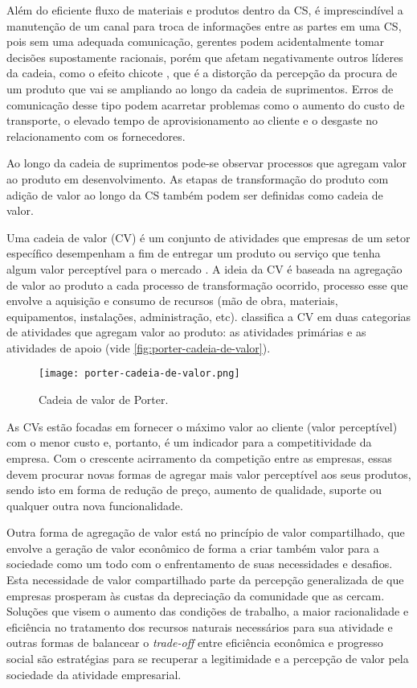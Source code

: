 	Além do eficiente fluxo de materiais e produtos dentro da CS, é imprescindível a manutenção de um canal para troca de informações entre as partes em uma CS, pois sem uma adequada comunicação, gerentes podem acidentalmente tomar decisões supostamente racionais, porém que afetam negativamente outros líderes da cadeia, como o efeito chicote \cite{lee1997bullwhip}, que é a distorção da percepção da procura de um produto que vai se ampliando ao longo da cadeia de suprimentos. Erros de comunicação desse tipo podem acarretar problemas como o aumento do custo de transporte, o elevado tempo de aprovisionamento ao cliente e o desgaste no relacionamento com os fornecedores.
	
	Ao longo da cadeia de suprimentos pode-se observar processos que agregam valor ao produto em desenvolvimento. As etapas de transformação do produto com adição de valor ao longo da CS também podem ser definidas como cadeia de valor.
	
	Uma cadeia de valor (CV) é um conjunto de atividades que empresas de um setor específico desempenham a fim de entregar um produto ou serviço que tenha algum valor perceptível para o mercado \cite{porter1985competitiveadvantage}. A ideia da CV é baseada na agregação de valor ao produto a cada processo de transformação ocorrido, processo esse que envolve a aquisição e consumo de recursos (mão de obra, materiais, equipamentos, instalações, administração, etc).  classifica a CV em duas categorias de atividades que agregam valor ao produto: as atividades primárias e as atividades de apoio (vide \autoref{fig:porter-cadeia-de-valor}).
		
	\begin{figure}[htb]
		\centering
		\caption{Cadeia de valor de Porter.}
		\label{fig:porter-cadeia-de-valor}
		\texttt{[image: porter-cadeia-de-valor.png]}
	\end{figure}
	
	As CVs estão focadas em fornecer o máximo valor ao cliente (valor perceptível) com o menor custo e, portanto, é um indicador para a competitividade da empresa. Com o crescente acirramento da competição entre as empresas, essas devem procurar novas formas de agregar mais valor perceptível aos seus produtos, sendo isto em forma de redução de preço, aumento de qualidade, suporte ou qualquer outra nova funcionalidade.
	
	Outra forma de agregação de valor está no princípio de valor compartilhado, que envolve a geração de valor econômico de forma a criar também valor para a sociedade como um todo \cite{porter2011valorcompartilhado} com o enfrentamento de suas necessidades e desafios. Esta necessidade de valor compartilhado parte da percepção generalizada de que empresas prosperam às custas da depreciação da comunidade que as cercam. Soluções que visem o aumento das condições de trabalho, a maior racionalidade e eficiência no tratamento dos recursos naturais necessários para sua atividade e outras formas de balancear o \textit{trade-off} entre eficiência econômica e progresso social são estratégias para se recuperar a legitimidade e a percepção de valor pela sociedade da atividade empresarial.
	
